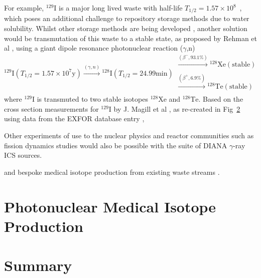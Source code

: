 \documentclass[../main.tex]{subfiles}
\begin{document}
For example, $^{129}\mathrm{I}$ is a major long lived waste with half-life $T_{1/2} = 1.57\times 10^{8}$~\si{\years}, which poses an additional challenge to repository storage methods \cite{cho2016reconsideration} due to water solubility. Whilst other storage methods are being developed \cite{lee2021chemical,morizet2021immobilization}, another solution would be transmutation of this waste to a stable state, as proposed by Rehman et al \cite{ur2017optimization}, using a giant dipole resonance photonuclear reaction ($\gamma$,n) 
\begin{equation}
^{129}\mathrm{I} \left(T_{1/2}=1.57\times 10^{7}\textrm{y}\right) \xrightarrow[]{\left(\gamma,n\right)} {}^{128}\mathrm{I} \left(T_{1/2}=24.99\mathrm{\si{\minute}}\right) \substack{\xrightarrow[]{\left(\beta^{-},93.1\%\right)} {}^{128}\mathrm{Xe}\left(\mathrm{stable}\right)\\[0.1em] \xrightarrow[]{\left(\beta^{+},6.9\%\right)} {}^{128}\mathrm{Te}\left(\mathrm{stable}\right)}
\label{eq:129I_photonuclear_transmutation}
\end{equation}
where $^{129}\mathrm{I}$ is transmuted to two stable isotopes $^{128}\mathrm{Xe}$ and $^{128}\mathrm{Te}$. Based on the cross section measurements for $^{129}\mathrm{I}$ by J. Magill et al \cite{}, as re-created in Fig~\ref{} using data from the EXFOR database entry \cite{}, 

Other experiments of use to the nuclear physics and reactor communities such as fission dynamics studies \cite{bellia1983towards,bhike2017exploratory,finch2018monoenergetic} would also be possible with the suite of DIANA $\gamma$-ray ICS sources.




 
  and bespoke medical isotope production from existing waste streams \cite{habs2011production}. 

\section{Photonuclear Medical Isotope Production}

\section{Summary}
\end{document}
